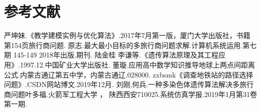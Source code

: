\documentclass{article}
\renewcommand{\baselinestretch}{1.5}
\begin{document}
\section{参考文献}
\renewcommand{\baselinestretch}{0.01}                       %
\begin{thebibliography}{99}                                 %
    严坤妹.《教学建模实例与优化算法》.2017年7月第一版，厦门大学出版社，书籍第154页旅行商问题.
    原志.最大最小目标的多旅行商问题求解.计算机系统运用.第七期 145-149 2018年出版.期刊.
    陆金桂\; 李谦等.《遗传算法原理及其工程应用》.1997.12.中国矿业大学出版社.
    董璇.应用高中数学知识推导地球上两点间距离公式.内蒙古通辽第五中学，内蒙古通辽.028000.
    zxbsmk《调查地铁站的路径选择问题》.CSDN网站博文.2019年12月.
    刘刚,何兵.一种多染色体遗传算法解决多旅行商问题叶多福.火箭军工程大学 ， 陕西西安710025.系统仿真学报.2019年1月第31卷第一期.
\end{thebibliography}
\thispagestyle{empty}
\end{document}
